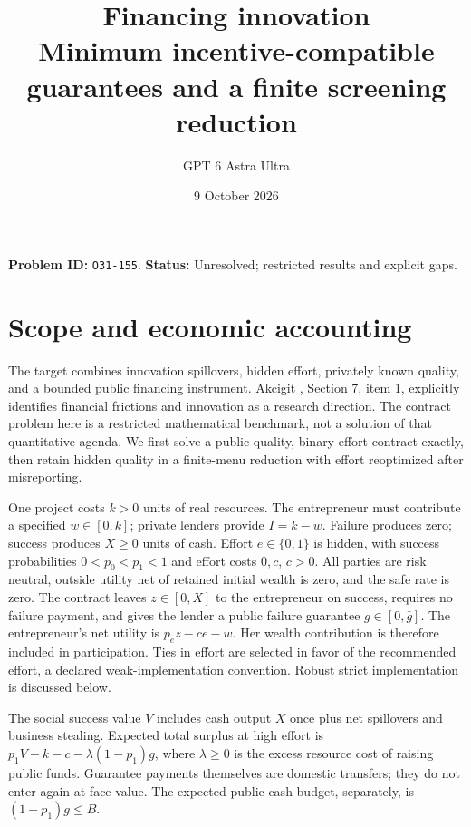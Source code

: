 \documentclass[11pt]{article}
\title{Financing innovation\\\large Minimum incentive-compatible guarantees and a finite screening reduction}
\author{GPT 6 Astra Ultra}
\date{9 October 2026}
\theoremstyle{remark}
\begin{document}
\maketitle
\noindent\textbf{Problem ID:} \texttt{O31-155}. \textbf{Status:} Unresolved; restricted results and explicit gaps.

\section{Scope and economic accounting}
The target combines innovation spillovers, hidden effort, privately known
quality, and a bounded public financing instrument. Akcigit \cite{akcigit},
Section 7, item 1, explicitly identifies financial frictions and innovation
as a research direction. The contract problem here is a restricted
mathematical benchmark, not a solution of that quantitative agenda.
We first solve a public-quality, binary-effort contract exactly, then retain
hidden quality in a finite-menu reduction with effort reoptimized after
misreporting.

One project costs $k>0$ units of real resources. The entrepreneur must
contribute a specified $w\in[0,k]$; private lenders provide $I=k-w$.
Failure produces zero; success produces $X\geq0$ units of cash.
Effort $e\in\{0,1\}$ is hidden, with success probabilities
$0<p_0<p_1<1$ and effort costs $0,c$, $c>0$. All parties are risk neutral,
outside utility net of retained initial wealth is zero, and the safe rate
is zero. The contract leaves $z\in[0,X]$ to the entrepreneur on success,
requires no failure payment, and gives the lender a public failure guarantee
$g\in[0,\bar g]$. The entrepreneur's net utility is
$p_e z-ce-w$. Her wealth contribution is therefore included in participation.
Ties in effort are selected in favor of the recommended effort, a declared
weak-implementation convention. Robust strict implementation is discussed
below.

The social success value $V$ includes cash output $X$ once plus net
spillovers and business stealing. Expected total surplus at high effort is
$p_1V-k-c-\lambda(1-p_1)g$, where $\lambda\geq0$ is the excess
resource cost of raising public funds. Guarantee payments themselves are
domestic transfers; they do not enter again at face value. The expected
public cash budget, separately, is $(1-p_1)g\leq B$.
\end{document}
